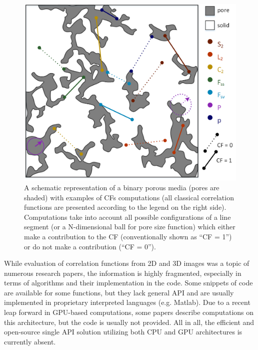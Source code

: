 \documentclass[1p]{elsarticle}
\begin{document}
\begin{figure}[ht]
  \centering
  \includegraphics[width=0.9\linewidth]{images/cf_1.png}
  \caption[]{A schematic representation of a binary porous media (pores are
    shaded) with examples of CFs computations (all classical correlation
    functions are presented according to the legend on the right
    side). Computations take into account all possible configurations of a line
    segment (or a N-dimensional ball for pore size function) which either make a
    contribution to the CF (conventionally shown as ``CF = 1'') or do not make a
    contribution (``CF = 0'').}
  \label{fig:functions}
\end{figure}

While evaluation of correlation functions from 2D and 3D images was a topic of
numerous research papers, the information is highly fragmented, especially in
terms of algorithms and their implementation in the code. Some snippets of code
are available for some functions, but they lack general API and are usually
implemented in proprietary interpreted languages (e.g. Matlab). Due to a recent
leap forward in GPU-based computations, some papers describe computations on
this architecture, but the code is usually not provided. All in all, the
efficient and open-source single API solution utilizing both CPU and GPU
architectures is currently absent.
\end{document}
